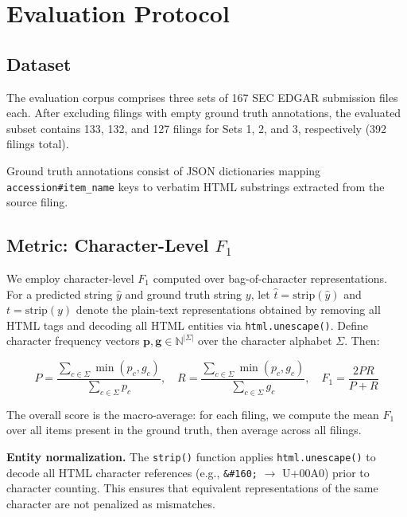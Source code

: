 \documentclass[12pt,letterpaper,oneside]{article}
\begin{document}
\section{Evaluation Protocol}\label{sec:eval}

\subsection{Dataset}

The evaluation corpus comprises three sets of 167 SEC EDGAR
submission files each. After excluding filings with empty ground
truth annotations, the evaluated subset contains 133, 132, and 127
filings for Sets 1, 2, and 3, respectively (392 filings total).

Ground truth annotations consist of JSON dictionaries mapping
\texttt{accession\#item\_name} keys to verbatim HTML substrings
extracted from the source filing.

\subsection{Metric: Character-Level $F_1$}

We employ character-level $F_1$ computed over bag-of-character
representations. For a predicted string $\hat{y}$ and ground truth
string $y$, let $\hat{t} = \text{strip}(\hat{y})$ and
$t = \text{strip}(y)$ denote the plain-text representations obtained
by removing all HTML tags and decoding all HTML entities via
\texttt{html.unescape()}. Define character frequency vectors
$\bm{p}, \bm{g} \in \mathbb{N}^{|\Sigma|}$ over the character
alphabet $\Sigma$. Then:

\begin{equation}\label{eq:f1}
P = \frac{\sum_{c \in \Sigma} \min(p_c, g_c)}{\sum_{c \in \Sigma} p_c}, \quad
R = \frac{\sum_{c \in \Sigma} \min(p_c, g_c)}{\sum_{c \in \Sigma} g_c}, \quad
F_1 = \frac{2PR}{P + R}
\end{equation}

The overall score is the macro-average: for each filing, we compute
the mean $F_1$ over all items present in the ground truth, then
average across all filings.

\noindent\textbf{Entity normalization.} The \texttt{strip()} function
applies \texttt{html.unescape()} to decode all HTML character
references (e.g., \texttt{\&\#160;} $\to$ U+00A0) prior to
character counting. This ensures that equivalent representations
of the same character are not penalized as mismatches.
\end{document}
